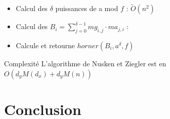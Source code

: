 \documentclass[10pt,a4paper]{beamer}
\begin{document}
\begin{frame}
    \begin{itemize}
        \item Calcul des $\delta$ puissances de a mod $f$ : $\tilde{O}(n^2)$
        \item Calcul des $B_i = \sum_{j=0}^{\delta-1} mg_{i,j}\cdot ma_{j,i}$ : %
        \item Calcule et retourne $horner(B_i, a^{\delta}, f)$
    \end{itemize}
    \begin{alertblock}{Complexité}
        L'algorithme de Nusken et Ziegler est en $O(d_yM(d_x) + d_yM(n))$
    \end{alertblock}
\end{frame}

\section{Conclusion}
\end{document}
